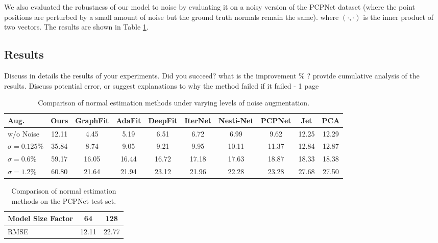 \documentclass{acmart}
\begin{document}
We also evaluated the robustness of our model to noise by evaluating it on a noisy version of the PCPNet dataset (where the point positions are perturbed by a small amount of noise but the ground truth normals remain the same). where $(\cdot, \cdot)$ is the inner product of two vectors. The results are shown in Table \ref{tab:noise_comparison}. 

 \subsection{Results}
 Discuss in details the results of your experiments. Did you succeed? what is the improvement \% ? provide cumulative analysis of the results. Discuss potential error, or suggest explanations to why the method failed if it failed - 
 1 page

 \begin{table}[ht]
  \centering
  \caption{Comparison of normal estimation methods under varying levels of noise augmentation.}
  \label{tab:noise_comparison}
  \begin{tabular}{lccccccccc}
  \hline
  \textbf{Aug.} & \textbf{Ours} & \textbf{GraphFit} & \textbf{AdaFit} & \textbf{DeepFit} & \textbf{IterNet} & \textbf{Nesti-Net} & \textbf{PCPNet} & \textbf{Jet} & \textbf{PCA} \\ \hline
  w/o Noise & 12.11 & 4.45  & 5.19  & 6.51  & 6.72  & 6.99  & 9.62  & 12.25 & 12.29 \\
  $\sigma = 0.125\%$ & 35.84 & 8.74  & 9.05  & 9.21  & 9.95  & 10.11 & 11.37 & 12.84 & 12.87 \\
  $\sigma = 0.6\%$  & 59.17 & 16.05 & 16.44 & 16.72 & 17.18 & 17.63 & 18.87 & 18.33 & 18.38 \\
  $\sigma = 1.2\%$  & 60.80 & 21.64 & 21.94 & 23.12 & 21.96 & 22.28 & 23.28 & 27.68 & 27.50 \\ \hline
  \end{tabular}
  \end{table}

\begin{table}[ht]
  \centering
  \caption{Comparison of normal estimation methods on the PCPNet test set.}
  \label{tab:comparison}
  \begin{tabular}{lcc}
  \hline
  \textbf{Model Size Factor} & \textbf{64} & \textbf{128} \\ \hline
  RMSE & 12.11 & 22.77 \\ \hline
  \end{tabular}
  \end{table}
\end{document}
